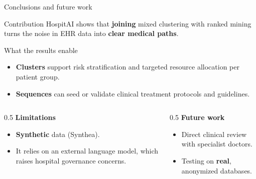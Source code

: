 \documentclass[aspectratio=169,11pt]{beamer}
\newcommand{\kw}[1]{{\color{hospaccent}\bfseries #1}}
\begin{document}
\begin{frame}{Conclusions and future work}
  \begin{block}{Contribution}
    HospitAI shows that \kw{joining} mixed clustering with ranked mining turns the noise in EHR data into \kw{clear medical paths}.
  \end{block}
  \vspace{0.18em}
  \begin{block}{What the results enable}
    \small
    \begin{itemize}\setlength{\itemsep}{0.2em}
      \item \kw{Clusters} support risk stratification and targeted resource allocation per patient group.
      \item \kw{Sequences} can seed or validate clinical treatment protocols and guidelines.
    \end{itemize}
  \end{block}
  \vspace{0.15em}
  \begin{columns}[T]
    \begin{column}{0.5\textwidth}
      \small\textbf{Limitations}
      \begin{itemize}
        \item \kw{Synthetic} data (Synthea).
        \item It relies on an external language model, which raises hospital governance concerns.
      \end{itemize}
    \end{column}
    \begin{column}{0.5\textwidth}
      \small\textbf{Future work}
      \begin{itemize}
        \item Direct clinical review with specialist doctors.
        \item Testing on \kw{real}, anonymized databases.
      \end{itemize}
    \end{column}
  \end{columns}
\end{frame}
\end{document}

